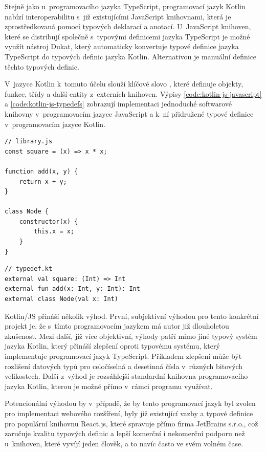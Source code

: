 Stejně jako u~programovacího jazyka TypeScript, programovací jazyk Kotlin nabízí interoperabilitu s~již existujícími JavaScript knihovnami, která je zprostředkovaná pomocí typových deklarací a anotací. 
U~JavaScript knihoven, které se distribují společně s~typovými definicemi jazyka TypeScript je možné využít nástroj Dukat, který automaticky konvertuje typové definice jazyka TypeScript do typových definic jazyka Kotlin. Alternativou je manuální definice těchto typových definic.

V~jazyce Kotlin k~tomuto účelu slouží klíčové slovo , které definuje objekty, funkce, třídy a další entity z~externích knihoven. Výpisy \ref{code:kotlin-js-javascript} a \ref{code:kotlin-js-typedefs} zobrazují implementaci jednoduché softwarové knihovny v~programovacím jazyce JavaScript a k~ní přidružené typové definice v~programovacím jazyce Kotlin.

\begin{lstlisting}[label={code:kotlin-js-javascript}, caption={Jednoduchá JavaScript knihovna pro demonstraci typových definic v~jazyce Kotlin (vlastní zpracování)}]
// library.js
const square = (x) => x * x;

function add(x, y) {
    return x + y;
}

class Node {
    constructor(x) {
        this.x = x; 
    }
}
\end{lstlisting}

\begin{lstlisting}[label={code:kotlin-js-typedefs}, caption={Typové definice v~jazyce Kotlin pro externí JavaScript knihovnu (vlastní zpracování)}]
// typedef.kt
external val square: (Int) => Int
external fun add(x: Int, y: Int): Int
external class Node(val x: Int)
\end{lstlisting}

Kotlin/JS přináší několik výhod. První, subjektivní výhodou pro tento konkrétní projekt je, že s~tímto programovacím jazykem má autor již dlouholetou zkušenost. Mezi další, již více objektivní, výhody patří mimo jiné typový systém jazyka Kotlin, který přináší zlepšení oproti typovému systému, který implementuje programovací jazyk TypeScript. Příkladem zlepšení může být rozlišení datových typů pro celočíselná a desetinná čísla v~různých bitových velikostech. Další z~výhod je rozsáhlejší standardní knihovna programovacího jazyka Kotlin, kterou je možné přímo v~rámci programu využívat. 

Potencionální výhodou by v~případě, že by tento programovací jazyk byl zvolen pro implementaci webového rozšíření, byly již existující vazby a typové definice pro populární knihovnu React.js, které spravuje přímo firma JetBrains s.r.o., což zaručuje kvalitu typových definic a lepší komerční i nekomerční podporu než u~knihoven, které vyvíjí jeden člověk,  a to navíc často ve svém volném čase.

